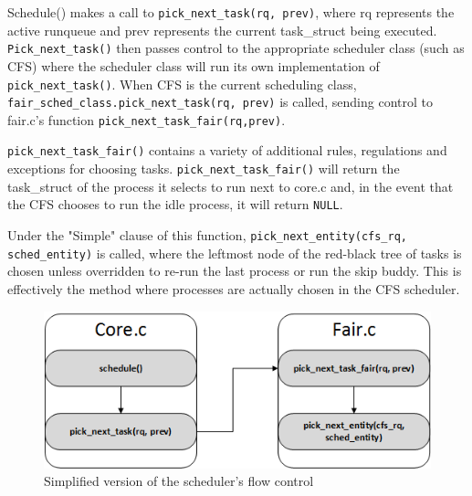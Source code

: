 Schedule() makes a call to \texttt{pick\_next\_task(rq, prev)}, where rq represents the active runqueue and prev represents the current task\_struct being executed. \texttt{Pick\_next\_task()} then passes control to the appropriate scheduler class (such as CFS) where the scheduler class will run its own implementation of \texttt{pick\_next\_task()}. When CFS is the current scheduling class, \texttt{fair\_sched\_class.pick\_next\_task(rq, prev)} is called, sending control to fair.c's function \texttt{pick\_next\_task\_fair(rq,prev)}.

\texttt{pick\_next\_task\_fair()} contains a variety of additional rules, regulations and exceptions for choosing tasks. \texttt{pick\_next\_task\_fair()} will return the task\_struct of the process it selects to run next to core.c and, in the event that the CFS chooses to run the idle process, it will return \texttt{NULL}.

Under the "Simple" clause of this function, \texttt{pick\_next\_entity(cfs\_rq, sched\_entity)} is called, where the leftmost node of the red-black tree of tasks is chosen unless overridden to re-run the last process or run the skip buddy. This is effectively the method where processes are actually chosen in the CFS scheduler.


\begin{figure}[hb]
	\includegraphics[width=1.0\columnwidth]{images/flowcontrol}
	\caption{Simplified version of the scheduler's flow control}
\end{figure}
